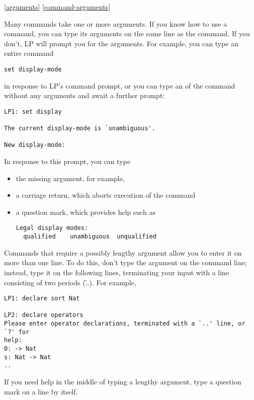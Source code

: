 \ref{arguments}
\ref{command-arguments}

Many commands take one or more arguments.  If you know how to use a command,
you can type its arguments on the same line as the command.  If you don't, LP
will prompt you for the arguments.  For example, you can type an entire command
\begin{verbatim}
set display-mode
\end{verbatim}
in response to LP's command prompt, or you can type an
 of the command without any arguments and
await a further prompt:
\begin{verbatim}
LP1: set display

The current display-mode is `unambiguous'.

New display-mode:
\end{verbatim}
In response to this prompt, you can type
\begin{itemize}
\item the missing argument, for example, 
\item a carriage return, which aborts execution of the command
\item a question mark, which provides help such as
\begin{verbatim}
Legal display modes:
  qualified    unambiguous  unqualified
\end{verbatim}
\end{itemize}
\p
Commands that require a possibly lengthy argument allow you to enter it on more
than one line.  To do this, don't type the argument on the command line;
instead, type it on the following lines, terminating your input with a line
consisting of two periods (\f{..}).  For example,
\begin{verbatim}
LP1: declare sort Nat

LP2: declare operators
Please enter operator declarations, terminated with a `..' line, or `?' for
help:
0: -> Nat
s: Nat -> Nat
..
\end{verbatim}
If you need help in the middle of typing a lengthy argument, type a question
mark on a line by itself.

